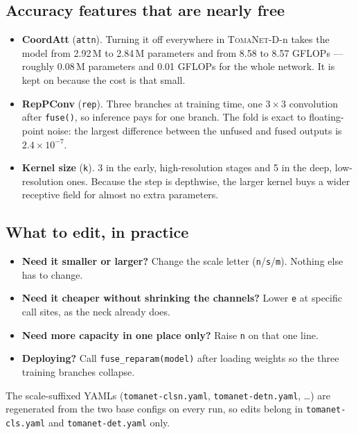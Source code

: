\documentclass[11pt,a4paper]{article}
\newcommand{\modeldet}{\textsc{TomaNet-D}}
\begin{document}
\subsection*{Accuracy features that are nearly free}
\begin{itemize}
  \item \textbf{CoordAtt} (\texttt{attn}). Turning it off everywhere in \modeldet{}-n takes
    the model from 2.92\,M to 2.84\,M parameters and from 8.58 to 8.57 GFLOPs --- roughly
    0.08\,M parameters and 0.01 GFLOPs for the whole network. It is kept on because the
    cost is that small.
  \item \textbf{RepPConv} (\texttt{rep}). Three branches at training time, one $3{\times}3$
    convolution after \texttt{fuse()}, so inference pays for one branch. The fold is exact
    to floating-point noise: the largest difference between the unfused and fused outputs
    is $2.4{\times}10^{-7}$.
  \item \textbf{Kernel size} (\texttt{k}). 3 in the early, high-resolution stages and 5 in
    the deep, low-resolution ones. Because the step is depthwise, the larger kernel buys a
    wider receptive field for almost no extra parameters.
\end{itemize}

\subsection*{What to edit, in practice}
\begin{itemize}
  \item \textbf{Need it smaller or larger?} Change the scale letter (\texttt{n}/\texttt{s}/\texttt{m}).
    Nothing else has to change.
  \item \textbf{Need it cheaper without shrinking the channels?} Lower \texttt{e} at
    specific call sites, as the neck already does.
  \item \textbf{Need more capacity in one place only?} Raise \texttt{n} on that one line.
  \item \textbf{Deploying?} Call \texttt{fuse\_reparam(model)} after loading weights so the
    three training branches collapse.
\end{itemize}

\noindent The scale-suffixed YAMLs
(\texttt{tomanet-clsn.yaml}, \texttt{tomanet-detn.yaml}, \dots) are regenerated from the
two base configs on every run, so edits belong in \texttt{tomanet-cls.yaml} and
\texttt{tomanet-det.yaml} only.
\end{document}

